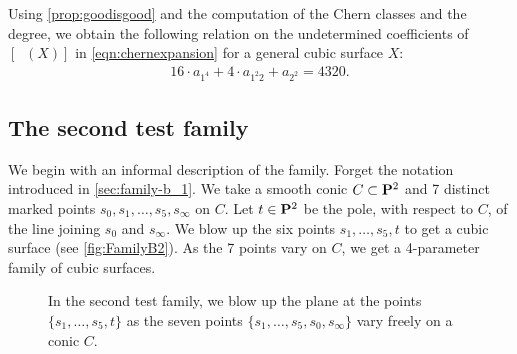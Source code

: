 \documentclass[12pt,reqno]{amsart}
\DeclareMathOperator{\Orb}{\overline{Orb}}
\numberwithin{equation}{section}
\begin{document}
Using \autoref{prop:goodisgood} and the computation of the Chern classes and the degree, we obtain the following relation on the undetermined coefficients of $[\Orb(X)]$ in
\eqref{eqn:chernexpansion} for a general cubic surface $X$:
\begin{align}
  \label{eq:relation1}
  16 \cdot a_{1^4} + 4 \cdot a_{1^2 2} + a_{2^2} = 4320.
\end{align}


\subsection{The second test family}
\label{sec:family-b_2}
We begin with an informal description of the family.
Forget the notation introduced in \autoref{sec:family-b_1}.
We take a smooth conic $C \subset \P^2$ and 7 distinct marked points $s_0, s_1, \dots, s_5, s_\infty$ on $C$.
Let $t \in \P^2$ be the pole, with respect to $C$, of the line joining $s_0$ and $s_\infty$.
We blow up the six points $s_1,\dots, s_5, t$ to get a cubic surface (see \autoref{fig:FamilyB2}).
As the 7 points vary on $C$, we get a 4-parameter family of cubic surfaces.

\begin{figure}
    \centering
    
    \caption{
      In the second test family, we blow up the plane at the points $\{s_{1}, \dots, s_{5}, t\}$ as the seven points $\{s_1, \dots, s_5, s_0, s_\infty\}$ vary freely on a conic $C$.}
    \label{fig:FamilyB2}
  \end{figure}
\end{document}
